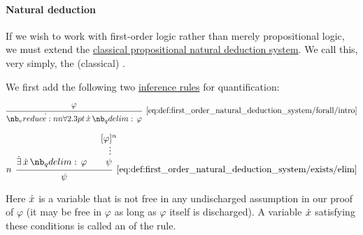 \paragraph{Natural deduction}

\begin{definition}\label{def:first_order_natural_deduction_system}
  If we wish to work with first-order logic rather than merely propositional logic, we must extend the \hyperref[def:propositional_natural_deduction_systemss]{classical propositional natural deduction system}. We call this, very simply, the (classical) .

  \begin{thmenum}
     We first add the following two \hyperref[con:judgment/inference_rule]{inference rules} for quantification:

    \begin{minipage}{0.45\textwidth}
      \begin{equation*}\taglabel[\ensuremath{ \synforall^+ }]{eq:def:first_order_natural_deduction_system/forall/intro}
        \begin{prooftree}
          \hypo{ \varphi }
          \infer1[\ref{eq:def:first_order_natural_deduction_system/forall/intro}]{ \qforall \synx \varphi }
        \end{prooftree}
      \end{equation*}
    \end{minipage}
    \hfill
    \begin{minipage}{0.45\textwidth}
      \begin{equation*}\taglabel[\ensuremath{ \synexists^- }]{eq:def:first_order_natural_deduction_system/exists/elim}
        \begin{prooftree}
          \hypo{ \qexists \synx \varphi }
          \hypo{ [\varphi]^n }
          \ellipsis {} { \psi }
          \infer[left label=\( n \)]2[\ref{eq:def:first_order_natural_deduction_system/exists/elim}]{ \psi }
        \end{prooftree}
      \end{equation*}
    \end{minipage}

    Here \( {\dot{x}} \) is a variable that is not free in any undischarged assumption in our proof of \( \varphi \) (it may be free in \( \varphi \) as long as \( \varphi \) itself is discharged). A variable \( {\dot{x}} \) satisfying these conditions is called an  of the rule.


\end{thmenum}
\end{definition}

